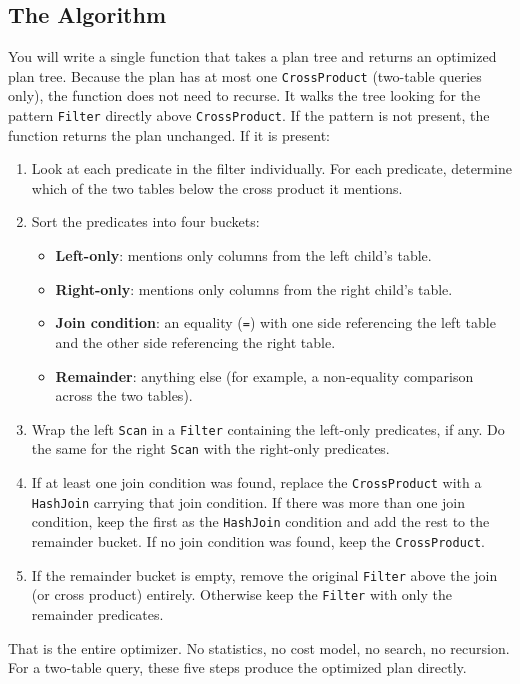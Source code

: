\documentclass[11pt,a4paper]{article}
\begin{document}
\subsection{The Algorithm}
You will write a single function that takes a plan tree and returns an optimized plan tree. Because the plan has at most one \texttt{CrossProduct} (two-table queries only), the function does not need to recurse. It walks the tree looking for the pattern \texttt{Filter} directly above \texttt{CrossProduct}. If the pattern is not present, the function returns the plan unchanged. If it is present:

\begin{enumerate}
\item Look at each predicate in the filter individually. For each predicate, determine which of the two tables below the cross product it mentions.
\item Sort the predicates into four buckets:
  \begin{itemize}
  \item \textbf{Left-only}: mentions only columns from the left child's table.
  \item \textbf{Right-only}: mentions only columns from the right child's table.
  \item \textbf{Join condition}: an equality (\texttt{=}) with one side referencing the left table and the other side referencing the right table.
  \item \textbf{Remainder}: anything else (for example, a non-equality comparison across the two tables).
  \end{itemize}
\item Wrap the left \texttt{Scan} in a \texttt{Filter} containing the left-only predicates, if any. Do the same for the right \texttt{Scan} with the right-only predicates.
\item If at least one join condition was found, replace the \texttt{CrossProduct} with a \texttt{HashJoin} carrying that join condition. If there was more than one join condition, keep the first as the \texttt{HashJoin} condition and add the rest to the remainder bucket. If no join condition was found, keep the \texttt{CrossProduct}.
\item If the remainder bucket is empty, remove the original \texttt{Filter} above the join (or cross product) entirely. Otherwise keep the \texttt{Filter} with only the remainder predicates.
\end{enumerate}

That is the entire optimizer. No statistics, no cost model, no search, no recursion. For a two-table query, these five steps produce the optimized plan directly.
\end{document}

